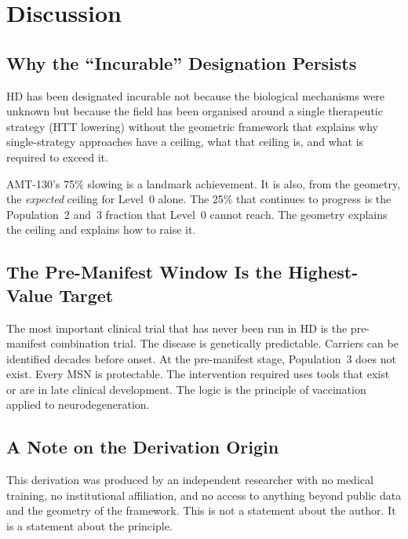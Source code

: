 \documentclass[12pt,a4paper]{article}
\begin{document}
\section{Discussion}

\subsection{Why the ``Incurable'' Designation Persists}

HD has been designated incurable not because the biological
mechanisms were unknown but because the field has been
organised around a single therapeutic strategy (HTT
lowering) without the geometric framework that explains
why single-strategy approaches have a ceiling, what that
ceiling is, and what is required to exceed it.

AMT-130's 75\% slowing is a landmark achievement. It is
also, from the geometry, the \emph{expected} ceiling for
Level~0 alone. The 25\% that continues to progress is the
Population~2 and~3 fraction that Level~0 cannot reach.
The geometry explains the ceiling and explains how to
raise it.

\subsection{The Pre-Manifest Window Is the
Highest-Value Target}

The most important clinical trial that has never been run
in HD is the pre-manifest combination trial. The disease
is genetically predictable. Carriers can be identified
decades before onset. At the pre-manifest stage,
Population~3 does not exist. Every MSN is protectable.
The intervention required uses tools that exist or are in
late clinical development. The logic is the principle of
vaccination applied to neurodegeneration.

\subsection{A Note on the Derivation Origin}

This derivation was produced by an independent researcher
with no medical training, no institutional affiliation, and
no access to anything beyond public data and the geometry
of the framework. This is not a statement about the author.
It is a statement about the principle.
\end{document}
